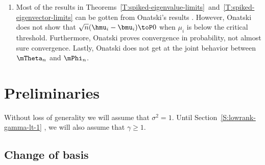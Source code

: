 \begin{enumerate}
\item 
Most of the results in Theorems~\ref{T:spiked-eigenvalue-limits}~and~\ref{T:spiked-eigenvector-limits} can be gotten from Onatski's results \cite{onatski2009}.   However, Onatski does not show that $\sqrt{n} (\hmu_i - \bmu_i) \toP 0$ when $\mu_i$ is below the critical threshold.  Furthermore, Onatski proves convergence in probability, not almost sure convergence.  Lastly, Onatski does not get at the joint behavior between $\mTheta_n$ and $\mPhi_n$.

\end{enumerate}

\section{Preliminaries}\label{S:lowrank-preliminaries}

Without loss of generality we will assume that $\sigma^2 = 1$.  Until Section~\ref{S:lowrank-gamma-lt-1} , we will also assume that $\gamma \geq 1$.

\subsection{Change of basis}

